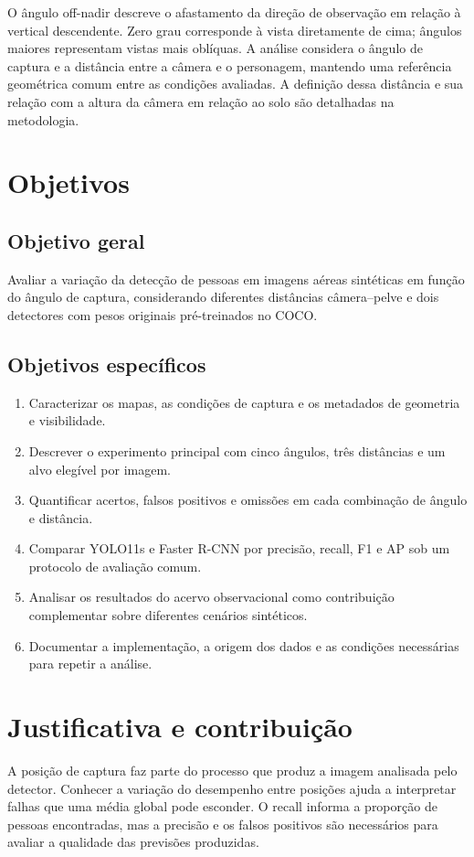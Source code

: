O ângulo off-nadir descreve o afastamento da direção de observação em relação à vertical descendente. Zero grau corresponde à vista diretamente de cima; ângulos maiores representam vistas mais oblíquas. A análise considera o ângulo de captura e a distância entre a câmera e o personagem, mantendo uma referência geométrica comum entre as condições avaliadas. A definição dessa distância e sua relação com a altura da câmera em relação ao solo são detalhadas na metodologia.

\section{Objetivos}
\subsection{Objetivo geral}
Avaliar a variação da detecção de pessoas em imagens aéreas sintéticas em função do ângulo de captura, considerando diferentes distâncias câmera--pelve e dois detectores com pesos originais pré-treinados no COCO.

\subsection{Objetivos específicos}
\begin{enumerate}
\item Caracterizar os mapas, as condições de captura e os metadados de geometria e visibilidade.
\item Descrever o experimento principal com cinco ângulos, três distâncias e um alvo elegível por imagem.
\item Quantificar acertos, falsos positivos e omissões em cada combinação de ângulo e distância.
\item Comparar YOLO11s e Faster R-CNN por precisão, recall, F1 e AP sob um protocolo de avaliação comum.
\item Analisar os resultados do acervo observacional como contribuição complementar sobre diferentes cenários sintéticos.
\item Documentar a implementação, a origem dos dados e as condições necessárias para repetir a análise.
\end{enumerate}

\section{Justificativa e contribuição}
A posição de captura faz parte do processo que produz a imagem analisada pelo detector. Conhecer a variação do desempenho entre posições ajuda a interpretar falhas que uma média global pode esconder. O recall informa a proporção de pessoas encontradas, mas a precisão e os falsos positivos são necessários para avaliar a qualidade das previsões produzidas.

